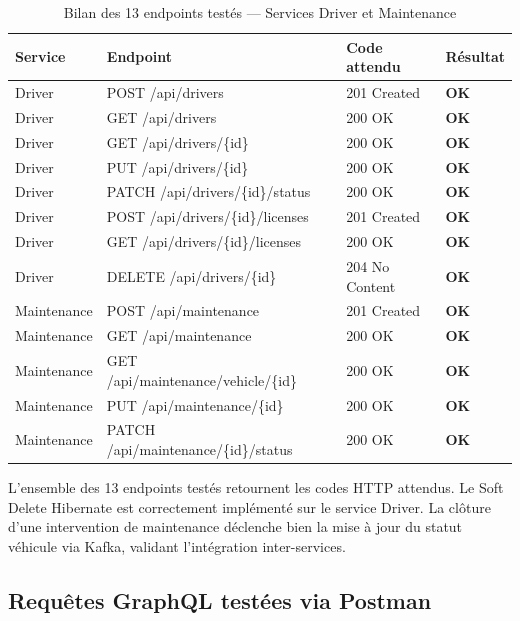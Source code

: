 \documentclass[12pt,a4paper]{article}
\begin{document}
\begin{table}[H]
\centering
\small
\begin{tabular}{|l|l|l|l|}
  \hline
  \rowcolor{primary!15}
  \textbf{Service} & \textbf{Endpoint} & \textbf{Code attendu} & \textbf{Résultat} \\
  \hline
  Driver & POST /api/drivers & 201 Created & \textcolor{success}{\textbf{OK}} \\
  Driver & GET /api/drivers & 200 OK & \textcolor{success}{\textbf{OK}} \\
  Driver & GET /api/drivers/\{id\} & 200 OK & \textcolor{success}{\textbf{OK}} \\
  Driver & PUT /api/drivers/\{id\} & 200 OK & \textcolor{success}{\textbf{OK}} \\
  Driver & PATCH /api/drivers/\{id\}/status & 200 OK & \textcolor{success}{\textbf{OK}} \\
  Driver & POST /api/drivers/\{id\}/licenses & 201 Created & \textcolor{success}{\textbf{OK}} \\
  Driver & GET /api/drivers/\{id\}/licenses & 200 OK & \textcolor{success}{\textbf{OK}} \\
  Driver & DELETE /api/drivers/\{id\} & 204 No Content & \textcolor{success}{\textbf{OK}} \\
  \hline
  Maintenance & POST /api/maintenance & 201 Created & \textcolor{success}{\textbf{OK}} \\
  Maintenance & GET /api/maintenance & 200 OK & \textcolor{success}{\textbf{OK}} \\
  Maintenance & GET /api/maintenance/vehicle/\{id\} & 200 OK & \textcolor{success}{\textbf{OK}} \\
  Maintenance & PUT /api/maintenance/\{id\} & 200 OK & \textcolor{success}{\textbf{OK}} \\
  Maintenance & PATCH /api/maintenance/\{id\}/status & 200 OK & \textcolor{success}{\textbf{OK}} \\
  \hline
\end{tabular}
\caption{Bilan des 13 endpoints testés --- Services Driver et Maintenance}
\label{tab:bilan-postman}
\end{table}

L'ensemble des 13 endpoints testés retournent les codes HTTP attendus. Le Soft Delete Hibernate est correctement implémenté sur le service Driver. La clôture d'une intervention de maintenance déclenche bien la mise à jour du statut véhicule via Kafka, validant l'intégration inter-services.

\subsection{Requêtes GraphQL testées via Postman}
\label{sec:postman-graphql}
\end{document}
